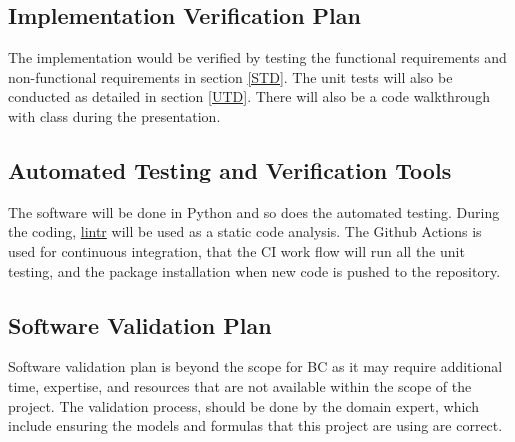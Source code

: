 \documentclass[12pt, titlepage]{article}
\begin{document}


\subsection{Implementation Verification Plan}\label{IVP}
The implementation would be verified by testing the functional requirements and non-functional requirements in section \ref{STD}. The unit tests will also be conducted as detailed in section \ref{UTD}. There will also be a code walkthrough with class during the presentation.


\subsection{Automated Testing and Verification Tools}\label{ATVT}
The software will be done in Python and so does the automated testing. During the coding, \href{https://lintr.r-lib.org/}{lintr} will be used as a static code analysis. The Github Actions is used for continuous integration, that the CI work flow will run all the unit testing, and the package installation when new code is pushed to the repository. 



\subsection{Software Validation Plan}\label{SVP}
Software validation plan is beyond the scope for BC as it may require additional time, expertise, and resources that are not available within the scope of the project. The validation process, should be done by the domain expert, which include ensuring the models and formulas that this project are using are correct.
\end{document}
